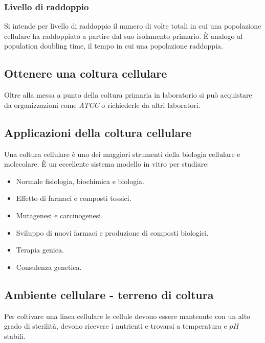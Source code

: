 		\subsubsection{Livello di raddoppio}
		Si intende per livello di raddoppio il numero di volte totali in cui una popolazione cellulare ha raddoppiato a partire dal suo isolamento primario.
		\`E analogo al population doubling time, il tempo in cui una popolazione raddoppia.

	\subsection{Ottenere una coltura cellulare}
	Oltre alla messa a punto della coltura primaria in laboratorio si pu\`o acquistare da organizzazioni come \emph{ATCC} o richiederle da altri laboratori.

	\subsection{Applicazioni della coltura cellulare}
	Una coltura cellulare \`e uno dei maggiori strumenti della biologia cellulare e molecolare.
	\`E un eccellente sistema modello in vitro per studiare:
	\begin{multicols}{2}
		\begin{itemize}
			\item Normale fisiologia, biochimica e biologia.
			\item Effetto di farmaci e composti tossici.
			\item Mutagenesi e carcinogenesi.
			\item Sviluppo di nuovi farmaci e produzione di composti biologici.
			\item Terapia genica.
			\item Consulenza genetica.
		\end{itemize}
	\end{multicols}

	\subsection{Ambiente cellulare - terreno di coltura}
	Per coltivare una linea cellulare le cellule devono essere mantenute con un alto grado di sterilit\`a, devono ricevere i nutrienti e trovarsi a temperatura e $pH$ stabili.

